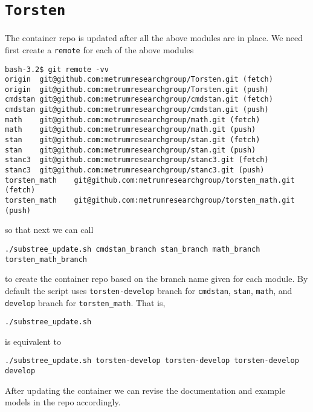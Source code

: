 \documentclass[12pt, reqno, oneside]{amsbook}
\numberwithin{equation}{chapter}
\numberwithin{figure}{chapter}
\numberwithin{table}{chapter}
\theoremstyle{remark}
\begin{document}
\section{\texttt{Torsten}}
\label{sec:org63cb8c1}
The container repo is updated after all the above modules are in
place. We need first create a \texttt{remote} for each of the above modules
\begin{verbatim}
bash-3.2$ git remote -vv
origin  git@github.com:metrumresearchgroup/Torsten.git (fetch)
origin  git@github.com:metrumresearchgroup/Torsten.git (push)
cmdstan git@github.com:metrumresearchgroup/cmdstan.git (fetch)
cmdstan git@github.com:metrumresearchgroup/cmdstan.git (push)
math    git@github.com:metrumresearchgroup/math.git (fetch)
math    git@github.com:metrumresearchgroup/math.git (push)
stan    git@github.com:metrumresearchgroup/stan.git (fetch)
stan    git@github.com:metrumresearchgroup/stan.git (push)
stanc3  git@github.com:metrumresearchgroup/stanc3.git (fetch)
stanc3  git@github.com:metrumresearchgroup/stanc3.git (push)
torsten_math    git@github.com:metrumresearchgroup/torsten_math.git (fetch)
torsten_math    git@github.com:metrumresearchgroup/torsten_math.git (push)
\end{verbatim}
so that next we can call 
\begin{verbatim}
./substree_update.sh cmdstan_branch stan_branch math_branch torsten_math_branch
\end{verbatim}
to create the container repo based on the branch name given for each
module. By default the script uses \texttt{torsten-develop} branch for
\texttt{cmdstan}, \texttt{stan}, \texttt{math}, and \texttt{develop} branch for
\texttt{torsten\_math}. That is,
\begin{verbatim}
./substree_update.sh
\end{verbatim}
is equivalent to
\begin{verbatim}
./substree_update.sh torsten-develop torsten-develop torsten-develop develop
\end{verbatim}

After updating the container we can revise the documentation and
example models in the repo accordingly.
\end{document}
